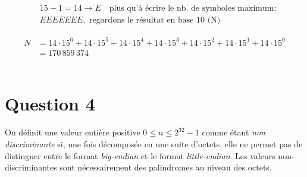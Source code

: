 \documentclass{article}
\begin{document}
\begin{flushleft}
\[
\begin{aligned}
&15 - 1 = 14 \rightarrow E \quad \text{plus qu'à écrire le nb. de symboles maximum:} \\
& EEEEEEE\text{,} \,\,\, \text{regardons le résultat en base 10 (N)}
\end{aligned}
\]
\end{flushleft}

\[
\begin{aligned}
N &= 14 \cdot 15^6 + 14 \cdot 15^5 + 14 \cdot 15^4 + 14 \cdot 15^3 + 14 \cdot 15^2 + 14 \cdot 15^1 + 14 \cdot 15^0 \\
&= 170\,859\,374
\end{aligned}
\]\\

\section*{Question 4}
On définit une valeur entière positive $0 \leq n \leq 2^{32} - 1$
comme étant \emph{non discriminante} si, une fois décomposée en une suite d’octets, 
elle ne permet pas de distinguer entre le format \emph{big-endian} et le format \emph{little-endian}. 
Les valeurs non-discriminantes sont nécessairement des palindromes au niveau des octets.
\end{document}
